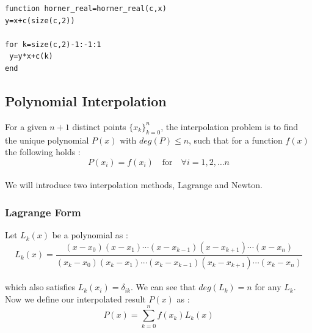 \documentclass[paper=a4, fontsize=11pt]{scrartcl}
\begin{document}
\begin{lstlisting}[caption='horner.m']
function horner_real=horner_real(c,x)
y=x+c(size(c,2))

for k=size(c,2)-1:-1:1
 y=y*x+c(k) 
end

\end{lstlisting}

 
\vspace{0.15in}
\subsection{Polynomial Interpolation}
\vspace{0.15in}

For a given $n+1$ distinct points $\{x_k\}_{k=0}^n$, the interpolation problem is to find the unique polynomial $P(x)$ with $deg(P) \leq n$, such that for a function $f(x)$ the following holds : \\

\begin{equation}\nonumber
	P(x_i) = f(x_i) \quad \text{for} \quad \forall i = 1,2 , \dots n
\end{equation}\\

We will introduce two interpolation methods, Lagrange and Newton. 

\vspace{0.15in}
\subsubsection{Lagrange Form}
\vspace{0.15in}
Let $L_k(x)$ be a polynomial as :\\

\begin{equation}\nonumber
	L_k(x) = \frac{(x - x_0)(x - x_1) \cdots (x - x_{k-1})(x - x_{k+1}) \cdots (x - x_n)}{(x_k - x_0)(x_k - x_1) \cdots (x_k - x_{k-1})(x_k - x_{k+1}) \cdots (x_k - x_n)}
\end{equation}\\

which also satisfies $L_k(x_i) = \delta_{ik}$. We can see that $deg(L_k) = n$ for any $L_k$. Now we define our interpolated result $P(x)$ as :\\

\begin{equation}\nonumber
	P(x) = \sum^{n}_{k=0} f(x_k) L_k(x)
\end{equation}\\
\end{document}
